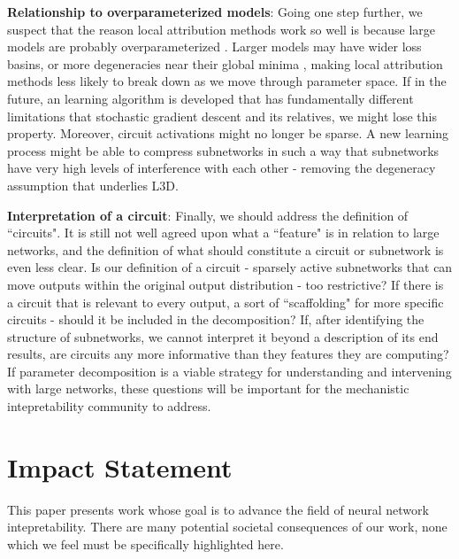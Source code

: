 \documentclass{article}
\theoremstyle{plain}
\theoremstyle{definition}
\theoremstyle{remark}
\begin{document}
\textbf{Relationship to overparameterized models}: Going one step further, we suspect that the reason local attribution methods work so well is because large models are probably overparameterized \cite{kawaguchi2016deep,choromanska2015loss,dauphin2014identifying,soudry2017exponentially}. Larger models may have wider loss basins, or more degeneracies near their global minima \cite{keskar2016large,sagun2017empirical}, making local attribution methods less likely to break down as we move through parameter space. If in the future, an learning algorithm is developed that has fundamentally different limitations that stochastic gradient descent and its relatives, we might lose this property. Moreover, circuit activations might no longer be sparse. A new learning process might be able to compress subnetworks in such a way that subnetworks have very high levels of interference with each other - removing the degeneracy assumption that underlies L3D. 

\textbf{Interpretation of a circuit}: Finally, we should address the definition of ``circuits". It is still not well agreed upon what a ``feature" is in relation to large networks, and the definition of what should constitute a circuit or subnetwork is even less clear. Is our definition of a circuit - sparsely active subnetworks that can move outputs within the original output distribution - too restrictive? If there is a circuit that is relevant to every output, a sort of ``scaffolding" for more specific circuits - should it be included in the decomposition? If, after identifying the structure of subnetworks, we cannot interpret it beyond a description of its end results, are circuits any more informative than they features they are computing? If parameter decomposition is a viable strategy for understanding and intervening with large networks, these questions will be important for the mechanistic intepretability community to address.

\clearpage

\section{Impact Statement}

This paper presents work whose goal is to advance the field of neural network intepretability. There are many potential societal consequences of our work, none which we feel must be specifically highlighted here.

\end{document}

